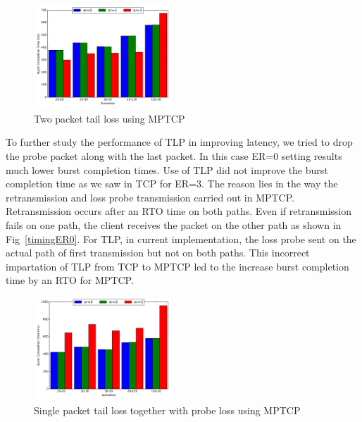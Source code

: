 \documentclass[10pt,draftcls,twocolumn]{IEEEconf}
\begin{document}
\begin{figure}[!ht]
\begin{center}
\includegraphics[angle=0, width=0.46\textwidth,natwidth=578.16,natheight=433.62]{plots/2P.pdf}
\caption{Two packet tail loss using MPTCP}\label{2p}
\end{center}
\end{figure}

To further study the performance of TLP in improving latency, we tried to drop the probe packet along with the last packet. In this case ER=0
setting results much lower burst completion times. Use of TLP did not improve the burst completion time as we saw in TCP for ER=3. The reason
lies in the way the retransmission and loss probe transmission carried out in MPTCP. Retransmission occurs after an RTO time on both paths.
Even if retransmission fails on one path, the client receives the packet on the other path as shown in Fig~\ref{timingER0}. For TLP, in
current implementation, the loss probe sent on the actual path of first transmission but not on both paths. This incorrect impartation of
TLP from TCP to MPTCP led to the increase burst completion time by an RTO for MPTCP. 


\begin{figure}[!ht]
\begin{center}
\includegraphics[angle=0, width=0.46\textwidth, natwidth=578.16,natheight=433.62]{plots/1PP.pdf}
\caption{Single packet tail loss together with probe loss using MPTCP}\label{1pp}
\end{center}
\end{figure}
\end{document}
